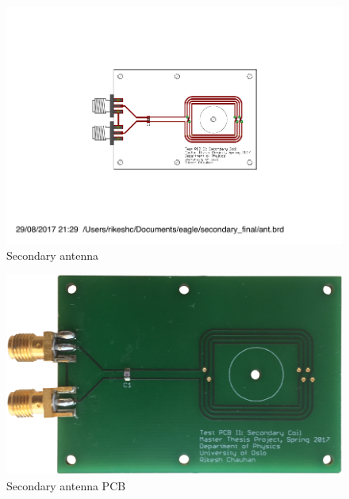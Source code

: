 \begin{appendices}
\begin{figure} [!htbp]	%
 	\centering
  	\includegraphics[width=1\textwidth]{appendix/pcb_sec.pdf} 
 	\caption{Secondary antenna} 
	\label{fig:appen_secondary} 
\end{figure}

\begin{figure} [!htbp]	%
 	\centering
  	\includegraphics[width=1\textwidth]{pcb/test_sec.png} 
 	\caption{Secondary antenna PCB} 
	\label{fig:appen_secondary_pcb} 
\end{figure}


\end{appendices}
